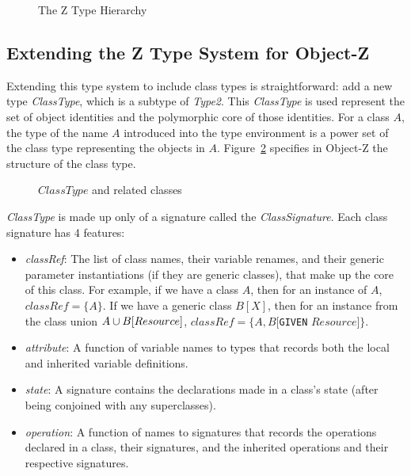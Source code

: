 \def\epsfsize#1#2{0.7#1}
\begin{figure}
\begin{center}
\end{center}
\caption{The Z Type Hierarchy}
\label{z-types}
\end{figure}
\def\epsfsize#1#2{\epsfxsize}

\subsection{Extending the Z Type System for Object-Z}

Extending this type system to include class types is straightforward:
add a new type {\em ClassType}, which is a subtype of {\em
Type2}. This {\em ClassType} is used represent the set of object
identities and the polymorphic core of those identities. For a class
$A$, the type of the name $A$ introduced into the type environment is
a power set of the class type representing the objects in
$A$. Figure~\ref{ClassType.fig} specifies in Object-Z
the structure of the class type.

\begin{figure}[t]
 
\caption{$ClassType$ and related classes}
\label{ClassType.fig}
\end{figure}

\vspace{2mm} {\em ClassType} is made up only of a signature called
the {\em ClassSignature}. Each class signature has 4 features:
\begin{itemize}
  \item {\em classRef}: The list of class names, their variable renames, and
    their generic parameter instantiations (if
    they are generic classes), that make up the core of
    this class. For example, if we have a class $A$, then for an
    instance of $A$, $classRef = \{ A \}$. If we have a generic class
    $B[X]$, then for an instance from the class union $A \classuni
    B[Resource]$, $classRef = \{ A, B[${\tt GIVEN} $Resource]\}$.
  \item {\em attribute}: A function of variable names to types that records
    both the local and inherited variable definitions.
  \item {\em state}: A signature contains the declarations made in a
    class's state (after being conjoined with any superclasses).
  \item {\em operation}: A function of names to signatures that
    records the operations declared in a class, their signatures, and
    the inherited operations and their respective signatures.
\end{itemize}


